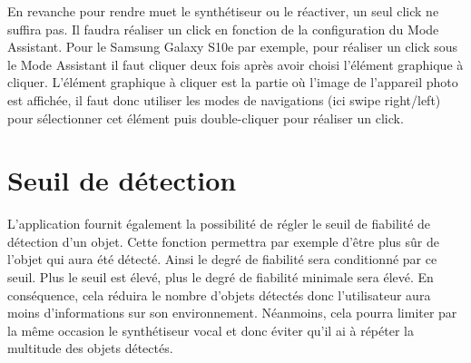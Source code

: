 \documentclass[UTF8]{EPURapport}
\begin{document}
En revanche pour rendre muet le synthétiseur ou le réactiver, un seul click ne suffira pas. Il faudra réaliser un click en fonction de la configuration du Mode Assistant. Pour le Samsung Galaxy S10e par exemple, pour réaliser un click sous le Mode Assistant il faut cliquer deux fois après avoir choisi l'élément graphique à cliquer. L'élément graphique à cliquer est la partie où l'image de l'appareil photo est affichée, il faut donc utiliser les modes de navigations (ici swipe right/left) pour sélectionner cet élément puis double-cliquer pour réaliser un click.

\section{Seuil de détection}

L'application fournit également la possibilité de régler le seuil de fiabilité de détection d'un objet. Cette fonction permettra par exemple d'être plus sûr de l'objet qui aura été détecté. Ainsi le degré de fiabilité sera conditionné par ce seuil. Plus le seuil est élevé, plus le degré de fiabilité minimale sera élevé. En conséquence, cela réduira le nombre d'objets détectés donc l'utilisateur aura moins d'informations sur son environnement. Néanmoins, cela pourra limiter par la même occasion le synthétiseur vocal et donc éviter qu'il ai à répéter la multitude des objets détectés.
\end{document}
